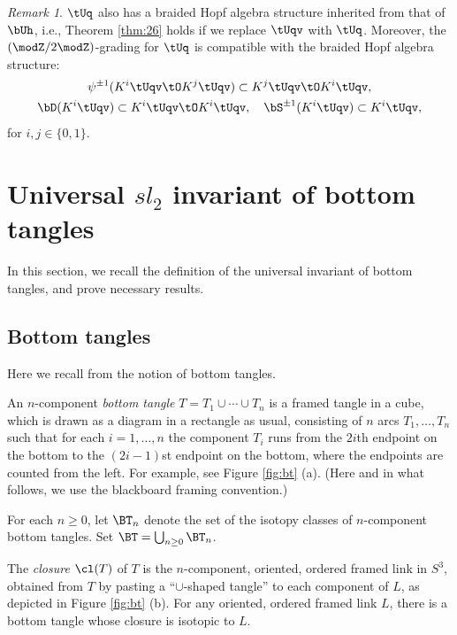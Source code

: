 \documentclass{amsart}
\numberwithin{equation}{section}
\numberwithin{figure}{section}
\theoremstyle{plain}
\theoremstyle{definition}
\theoremstyle{remark}
\newtheorem{remark}[theorem]{Remark}
\begin{document}
\begin{remark}
  \label{r15}
  $\tUq$ also has a braided Hopf algebra structure inherited from that
  of $\bUh$, i.e., Theorem \ref{thm:26} holds if we replace
  $\tUqv$ with $\tUq$.  Moreover, the $(\modZ /2\modZ )$-grading for $\tUq$ is
  compatible with the braided Hopf algebra structure:
  \begin{gather*}
    \psi ^{\pm 1}(K^i\tUqv\tO K^j\tUqv)\subset K^j\tUqv\tO K^i\tUqv,\\
    \bD(K^i\tUqv)\subset K^i\tUqv \tO K^i\tUqv,\quad
    \bS^{\pm 1}(K^i\tUqv)\subset K^i\tUqv,
  \end{gather*}
  for $i,j\in \{0,1\}$.
\end{remark}

\section{Universal $sl_2$ invariant of bottom tangles}
\label{sec4}

In this section, we recall the definition of the universal invariant
of bottom tangles, and prove necessary results.

\subsection{Bottom tangles}
\label{sec:bottom-tangles}

Here we recall from \cite{H:universal} the notion of bottom tangles.

An $n$-component {\it bottom tangle} $T=T_1\cup \cdots\cup T_n$ is a framed
tangle in a cube, which is drawn as a diagram in a rectangle as usual,
consisting of $n$ arcs $T_1,\ldots,T_n$ such that for each $i=1,\ldots,n$ the
component $T_i$ runs from the $2i$th endpoint on the bottom to the
$(2i-1)$st endpoint on the bottom, where the endpoints are counted
from the left.  For example, see Figure \ref{fig:bt} (a).
 (Here and in what
follows, we use the blackboard framing convention.)

For each $n\ge 0$, let $\BT_n$ denote the set of the isotopy classes of
$n$-component bottom tangles.  Set $\BT=\bigcup_{n\ge 0}\BT_n$.

The {\em closure} $\cl(T)$ of $T$ is the $n$-component, oriented,
ordered framed link in $S^3$, obtained from $T$ by pasting a
``$\cup $-shaped tangle'' to each component of $L$, as depicted in Figure
\ref{fig:bt} (b).  For any oriented, ordered framed link $L$, there is
a bottom tangle whose closure is isotopic to $L$.
\end{document}
